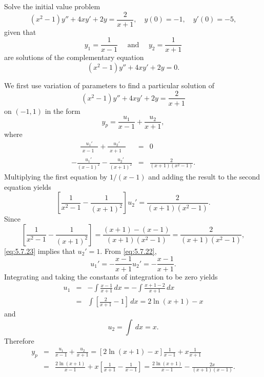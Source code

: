 \begin{example}
  \label{example:5.7.4} \rm Solve the initial value problem
  \begin{equation}
    \label{eq:5.7.21}(x^{2}-1)y''+4xy'+2y=\frac{2}{x+1},\quad y(0)=-1,\quad y'(0)=-5,
  \end{equation}
  given that
  \[
    y_{1}=\frac{1}{x-1}\quad\mbox{ and }\quad y_{2}=\frac{1}{x+1}
  \]
  are solutions of the complementary equation
  \[
    (x^{2}-1)y''+4xy'+2y=0.
  \]
\end{example}

\begin{examplesolution}
\solution We first use variation of parameters to find a particular solution of
\[
  (x^{2}-1)y''+4xy'+2y=\frac{2}{x+1}
\]
on $(-1,1)$ in the form
\[
  y_{p}=\frac{u_{1}}{x-1}+\frac{u_{2}}{x+1},
\]
where
\begin{eqnarray}
  \phantom{-}{\frac{u_{1}'}{\phantom{(}x-1\phantom{)^{2}}}}+\frac{u_{2}'}{\phantom{(}x+1\phantom{)^{2}}} & = & 0\label{eq:5.7.22} \\
  -\frac{u_{1}'}{(x-1)^{2}}-\frac{u_{2}'}{(x+1)^{2}}                                                     & = & \frac{2}{(x+1)(x^{2}-1)}.\nonumber
\end{eqnarray}
Multiplying the first equation by $1/(x-1)$ and adding the result to the second equation yields
\begin{equation}
  \label{eq:5.7.23}\left[\frac{1}{x^{2}-1}-\frac{1}{(x+1)^{2}}\right]u_{2}'=\frac{2}{(x+1)(x^{2}-1)}.
\end{equation}
Since
\[
  \left[\frac{1}{x^{2}-1}-\frac{1}{(x+1)^{2}}\right]=\frac{(x+1)-(x-1)}{(x+1)(x^{2}-1)}=\frac{2}{(x+1)(x^{2}-1)},
\]
\eqref{eq:5.7.23} implies that $u_{2}'=1$. From \eqref{eq:5.7.22},
\[
  u_{1}'=-\frac{x-1}{x+1}u_{2}'=-\frac{x-1}{x+1}.
\]
Integrating and taking the constants of integration to be zero yields
\begin{eqnarray*}
  u_{1} & = & -\int\frac{x-1}{x+1}\,dx=-\int\frac{x+1-2}{x+1}\,dx \\
        & = & \int\left[\frac{2}{x+1}-1\right]\,dx=2\ln(x+1)-x
\end{eqnarray*}
and
\[
  u_{2}=\int\,dx=x.
\]
Therefore
\begin{eqnarray*}
  y_{p} & = & \frac{u_{1}}{x-1}+\frac{u_{2}}{x+1}=\left[2\ln(x+1)-x\right]{\frac{1}{x-1}}+x\frac{1}{x+1} \\
        & = & \frac{2\ln(x+1)}{x-1}+x\left[\frac{1}{x+1}-\frac{1}{x-1}\right]=\frac{2\ln(x+1)}{x-1}-\frac{2x}{(x+1)(x-1)}.
\end{eqnarray*}

\end{examplesolution}
